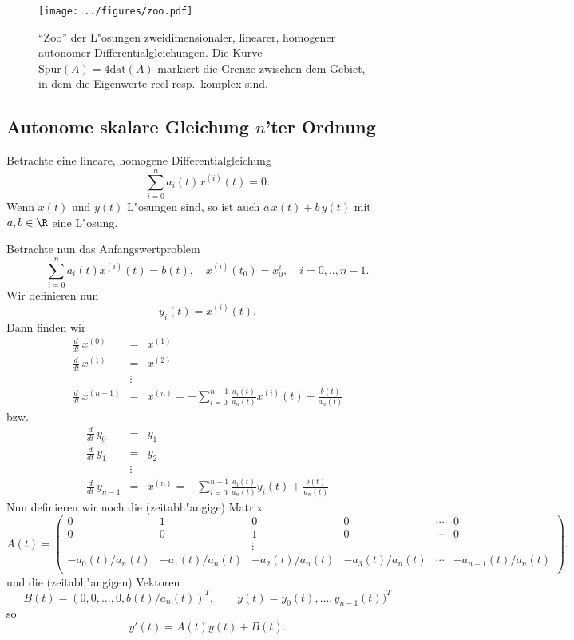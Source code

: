 \begin{figure}[htb]
\begin{center}
\texttt{[image: ../figures/zoo.pdf]}
\end{center}
\caption{``Zoo'' der L"osungen zweidimensionaler, linearer, 
homogener autonomer Differentialgleichungen. Die Kurve 
$\mbox{Spur}(A) = 4\mbox{dat}(A)$ markiert die Grenze zwischen dem Gebiet,
in dem die Eigenwerte reel resp.\ komplex sind.}
\label{zoo}
\end{figure}
\begin{auf}\cha\label{block2A5}

\end{auf}
\subsection{Autonome skalare Gleichung $n$'ter Ordnung}
\begin{sbem} Betrachte eine lineare, homogene Differentialgleichung
$$ \sum_{i=0}^n a_i(t) x^{(i)}(t) = 0.$$
Wenn $x(t)$ und $y(t)$ L"osungen sind, so ist auch $a\, x(t)+b\,y(t)$ mit $a,b\in\R$ eine L"osung. 
\end{sbem}
Betrachte nun das Anfangswertproblem 
$$ \sum_{i=0}^n a_i(t) x^{(i)}(t) = b(t), \quad  x^{(i)}(t_0) = x_0^i,\quad i=0,..,n-1.$$
Wir definieren nun
$$ y_i(t) = x^{(i)}(t).$$
Dann finden wir
\begin{eqnarray*}
\frac d {dt}\,  x^{(0)} & = & x^{(1)}\\
\frac d {dt}\, x^{(1)}  & = & x^{(2)}\\
 & \vdots & \\
\frac d {dt}\, x^{(n-1)}  & = & x^{(n)} =  -\sum_{i=0}^{n-1} \frac{a_i(t)}{a_n(t)} x^{(i)}(t) +\frac{b(t)}{a_n(t)}
\end{eqnarray*}
bzw.
\begin{eqnarray*}
\frac d {dt}\,  y_0 & = & y_1\\
\frac d {dt}\, y_1 & = & y_2\\
 & \vdots & \\
\frac d {dt}\, y_{n-1}  & = & x^{(n)}  = -\sum_{i=0}^{n-1} \frac{a_i(t)}{a_n(t)} y_i(t) +
\frac{b(t)}{a_n(t)}
\end{eqnarray*}
Nun definieren wir noch die (zeitabh"angige) Matrix
$$ A(t) = \left(\begin{array}{cccccc}
0 & 1 & 0 & 0 & \cdots & 0\\
0 & 0 & 1 & 0 & \cdots & 0\\
  &      &  \vdots &        &   \\
  -a_0(t)/a_n(t) & -a_1(t)/a_n(t)   & -a_2(t)/a_n(t)   & -a_3(t)/a_n(t)&\cdots    & -a_{n-1}(t)/a_n(t)  \\
  \end{array}
   \right).
$$
und die (zeitabh"angigen) Vektoren
$$ B(t) = (0,0,...,0, b(t)/a_n(t))^T,\qquad y(t) = y_0(t),...,y_{n-1}(t))^T$$
so
$$ y'(t) = A(t) y(t) +B(t).$$


